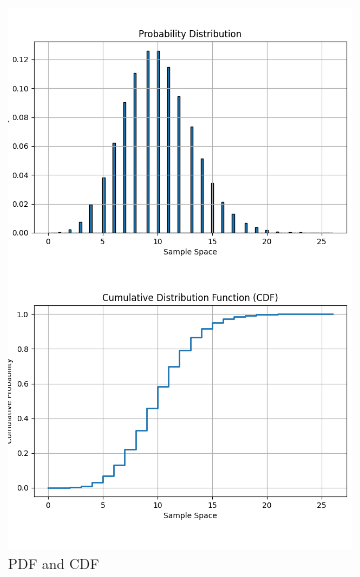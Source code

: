 \documentclass{article}
\begin{document}
\begin{figure}[H]
  \centering
  \begin{subfigure}{0.45\textwidth}
    \centering
    \includegraphics[width=\linewidth]{results/section1/e1(1).png}
    \caption{PDF and CDF}
  \end{subfigure}
  \hfill
  \begin{subfigure}{0.45\textwidth}
    \centering

\end{subfigure}
\end{figure}
\end{document}
